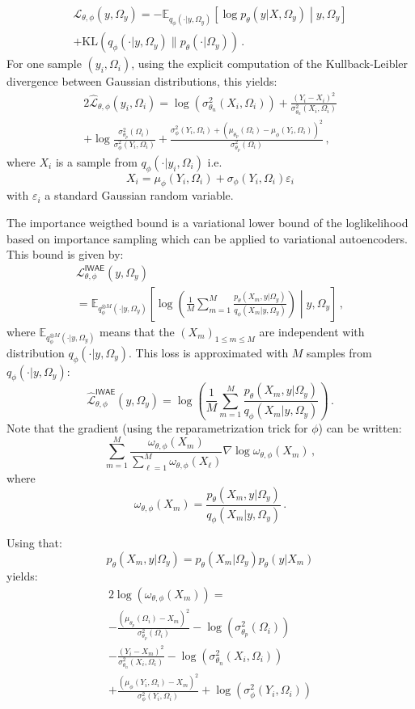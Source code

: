 \documentclass[review]{cvpr}
\begin{document}
\begin{multline*}
 \mathcal{L}_{\theta,\phi}(y,\Omega_y)  =   -\mathbb{E}_{q_{\phi}(\cdot|y,\Omega_y)}\left[\log p_\theta(y|X,\Omega_y)\middle |y,\Omega_y\right] \\ + \mathrm{KL}\left(q_{\phi}(\cdot|y,\Omega_y)\| p_\theta(\cdot|\Omega_y)\right)\,.
\end{multline*}
For one sample $(y_i,\Omega_i)$, using the explicit computation of the  Kullback-Leibler divergence between Gaussian distributions, this yields:
\begin{multline*}
2\widehat{\mathcal{L}}_{\theta,\phi}(y_i,\Omega_i)  =   \log(\sigma^2_{\theta_n}(X_i,\Omega_i)) + \frac{(Y_i-X_i)^2}{\sigma^2_{\theta_n}(X_i,\Omega_i)} \\ + \log\frac{\sigma^2_{\theta_p}(\Omega_i)}{\sigma^2_{\phi}(Y_i,\Omega_i)} + \frac{\sigma^2_{\phi}(Y_i,\Omega_i) + \left(\mu_{\theta_p}(\Omega_i) - \mu_\phi(Y_i,\Omega_i)\right)^2}{\sigma^2_{\theta_p}(\Omega_i)}\,,
\end{multline*}
where $X_i$ is a sample from $q_\phi(\cdot|y_i,\Omega_i)$ i.e.
$$
X_i = \mu_\phi(Y_i,\Omega_i) + \sigma_\phi(Y_i,\Omega_i)\varepsilon_i
$$
with $\varepsilon_i$ a standard Gaussian random variable.

The importance weigthed bound is a variational lower bound of the loglikelihood based on importance sampling which can be applied to variational autoencoders. This bound is given by:
\begin{multline*}
 \mathcal{L}^{\mathsf{IWAE}}_{\theta,\phi}(y,\Omega_y)  \\
= \mathbb{E}_{q^{\otimes M}_{\phi}(\cdot|y,\Omega_y)}\left[\log \left(\frac{1}{M}\sum_{m=1}^M\frac{p_\theta(X_m,y|\Omega_y)}{q_{\phi}(X_m|y,\Omega_y)}\right)\middle |y,\Omega_y\right]\,,
\end{multline*}
where $\mathbb{E}_{q^{\otimes M}_{\phi}(\cdot|y,\Omega_y)}$ means that the $(X_m)_{1\leqslant m \leqslant M}$ are independent with distribution $q_{\phi}(\cdot|y,\Omega_y)$. This loss is approximated with $M$ samples from $q_{\phi}(\cdot|y,\Omega_y)$:
$$
 \widehat{\mathcal{L}}^{\mathsf{IWAE}}_{\theta,\phi}(y,\Omega_y)
= \log \left(\frac{1}{M}\sum_{m=1}^M\frac{p_\theta(X_m,y|\Omega_y)}{q_{\phi}(X_m|y,\Omega_y)}\right)\,.
$$
Note that the gradient (using the reparametrization trick for $\phi$)  can be written:
$$
\sum_{m=1}^M \frac{\omega_{\theta,\phi}(X_m)}{\sum_{\ell=1}^M\omega_{\theta,\phi}(X_\ell)} \nabla\log \omega_{\theta,\phi}(X_m)\,,
$$
where
$$
\omega_{\theta,\phi}(X_m) = \frac{p_\theta(X_m,y|\Omega_y)}{q_{\phi}(X_m|y,\Omega_y)}\,.
$$

Using that:
$$
p_\theta(X_m,y|\Omega_y) = p_\theta(X_m|\Omega_y) p_\theta(y|X_m)
$$
yields:
\begin{multline*}
2\log(\omega_{\theta,\phi}(X_m)) = \\
- \frac{( \mu_{\theta_p}(\Omega_i) - X_m )^2}{\sigma^2_{\theta_p}(\Omega_i)} - \log(\sigma^2_{\theta_p}(\Omega_i)) \\
- \frac{( Y_i - X_m )^2}{\sigma^2_{\theta_n}(X_i,\Omega_i)} - \log(\sigma^2_{\theta_n}(X_i,\Omega_i)) \\
+ \frac{( \mu_\phi(Y_i,\Omega_i) - X_m )^2}{\sigma^2_{\phi}(Y_i,\Omega_i)} + \log(\sigma^2_{\phi}(Y_i,\Omega_i))
\end{multline*}
\end{document}
